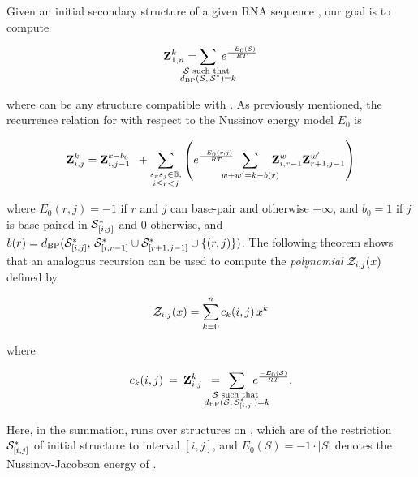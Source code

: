 Given an initial secondary structure \strSt of a
given RNA sequence \seq, our goal is to compute

\begin{align}
\label{eq:fftbor:defZofK}
\bfZ{k}{1,n} = \sum_{\mathclap{\substack{\str \text{ such that }\\ \dBP{\str}{\strSt}=k}}}\;
\boltzNuss{\str}
\end{align}

where \str can be any structure compatible with \seq.
As previously mentioned, the recurrence relation for \rnabor
with respect to the Nussinov energy model $E_0$ is


\begin{align}
\label{eq:fftbor:rnaborNuss}
\bfZ{k}{i,j} = \bfZ{k-b_0}{i,j-1}\enspace +
\sum_{\substack{s_r s_j \in \bpSet, \\ i \le r<j}}
\left(
\boltzNuss{r,j}\enspace \sum_{\mathclap{w+w'=k-b(r)}}\quad
\bfZ{w}{i,r-1} \bfZ{w'}{r+1,j-1}
\right)
\end{align}

where $E_0(r,j)=-1$ if $r$ and $j$ can base-pair and otherwise
$+\infty$, and
$b_0 = 1$ if $j$ is base paired in $\mathcal S^*_{[i,j]}$ and $0$ otherwise, and
$b(r)=d_{\text{BP}}(\mathcal S^*_{[i,j]},\,\mathcal S^*_{[i,r-1]} \cup \mathcal S^*_{[r+1,j-1]} \cup\{(r,j)\})$.
The following theorem shows that an analogous recursion can be used to compute
the {\em polynomial} ${\mathcal Z}_{i,j}(x)$ defined by

\begin{align}
\label{eq:fftbor:polynomialZij}
\emZ{i,j} = \sum_{k=0}^n c_k(i,j)\,x^k
\end{align}

where

\begin{align}
c_k(i,j)\>=\>
\bfZ{k}{i,j}\enspace=\enspace
\sum_{\mathclap{\substack{\str \text{ such that } \\
\dBP{\str}{\strSt_{[i,j]}}=k}}}\enspace
\boltzNuss{\str}.
\end{align}

Here, in the summation, \str runs over structures on \seqIJ, which
are \kNbrs of the restriction $\mathcal S^*_{[i,j]}$ of initial structure
\strSt to interval $[i,j]$, and
$E_0(S)=-1 \cdot |S|$ denotes the Nussinov-Jacobson energy of \str.

